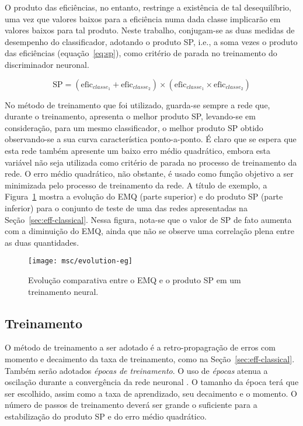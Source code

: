 O produto das eficiências, no entanto, restringe a existência de tal
desequilíbrio, uma vez que valores baixos para a eficiência numa dada classe
implicarão em valores baixos para tal produto. Neste trabalho, conjugam-se as
duas medidas de desempenho do classificador, adotando o produto SP, i.e., a
soma vezes o produto das eficiências (equação~\ref{eq:sp}), como critério de
parada no treinamento do discriminador neuronal.

\begin{equation}
\text{SP} = (\text{efic}_{classe_1} + \text{efic}_{classe_2}) \times
(\text{efic}_{classe_1} \times \text{efic}_{classe_2})
\label{eq:sp}
\end{equation}

No método de treinamento que foi utilizado, guarda-se sempre a rede que,
durante o treinamento, apresenta o melhor produto SP, levando-se em
consideração, para um mesmo classificador, o melhor produto SP obtido
observando-se a sua curva característica ponto-a-ponto. É claro que se espera
que esta rede também apresente um baixo erro médio quadrático, embora esta
variável não seja utilizada como critério de parada no processo de treinamento
da rede. O erro médio quadrático, não obstante, é usado como função objetivo a
ser minimizada pelo processo de treinamento da rede. A título de exemplo, a
Figura~\ref{fig:emq-sp} mostra a evolução do EMQ (parte superior) e do produto
SP (parte inferior) para o conjunto de teste de uma das redes apresentadas na
Seção~\ref{sec:eff-classical}. Nessa figura, nota-se que o valor de SP de fato
aumenta com a diminuição do EMQ, ainda que não se observe uma correlação plena
entre as duas quantidades.

\begin{figure}
\begin{center}
\texttt{[image: msc/evolution-eg]}
\end{center}
\caption{Evolução comparativa entre o EMQ e o produto SP em um treinamento
neural.}
\label{fig:emq-sp}
\end{figure}

\subsection{Treinamento}

O método de treinamento a ser adotado é a retro-propagração de erros com
momento e decaimento da taxa de treinamento, como na
Seção~\ref{sec:eff-classical}. Também serão adotados \emph{épocas de
treinamento}. O uso de \emph{épocas} atenua a oscilação durante a convergência
da rede neuronal \cite{haykin, jetnet}. O tamanho da época terá que ser
escolhido, assim como a taxa de aprendizado, seu decaimento e o momento. O
número de passos de treinamento deverá ser grande o suficiente para a
estabilização do produto SP e do erro médio quadrático.

